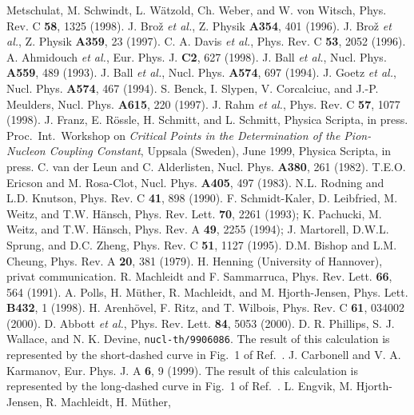 \begin{references}
Metschulat, M. Schwindt, L. W\"atzold, Ch. Weber, and W. von Witsch,
Phys. Rev. C {\bf 58}, 1325 (1998).
 J. Bro\v{z} {\it et al.}, Z. Physik {\bf A354}, 401 (1996).
 J. Bro\v{z} {\it et al.}, Z. Physik {\bf A359}, 23 (1997).
 C. A. Davis {\it et al.}, Phys. Rev. C {\bf 53}, 2052 (1996).
 A. Ahmidouch {\it et al.}, Eur. Phys. J. {\bf C2}, 627 (1998).
 J. Ball {\it et al.}, Nucl. Phys. {\bf A559}, 489 (1993).
 J. Ball {\it et al.}, Nucl. Phys. {\bf A574}, 697 (1994).
 J. Goetz {\it et al.}, Nucl. Phys. {\bf A574}, 467 (1994).
 S. Benck, I. Slypen, V. Corcalciuc, and J.-P. Meulders,
Nucl. Phys. {\bf A615}, 220 (1997).
 J. Rahm {\it et al.}, Phys. Rev. C {\bf 57}, 1077 (1998).
 J. Franz, E. R\"ossle, H. Schmitt, and L. Schmitt, 
Physica Scripta, in press.
 Proc.\ Int.\ Workshop on 
{\it Critical Points in the Determination of the Pion-Nucleon
Coupling Constant}, Uppsala (Sweden), June 1999, 
Physica Scripta, in press.
 C. van der Leun and C. Alderlisten, Nucl. Phys.
         {\bf A380}, 261 (1982).
 T.E.O. Ericson and M. Rosa-Clot, Nucl. Phys. {\bf A405},
         497 (1983).
 N.L. Rodning and L.D. Knutson, Phys. Rev. C {\bf 41},
         898 (1990).
 F. Schmidt-Kaler, D. Leibfried, M. Weitz, 
         and T.W. H\"ansch, Phys. Rev. Lett. {\bf 70}, 2261 (1993);
         K. Pachucki, M. Weitz, and T.W. H\"ansch, Phys. Rev. A
         {\bf 49}, 2255 (1994); J. Martorell, D.W.L. Sprung, and
         D.C. Zheng, Phys. Rev. C {\bf 51}, 1127 (1995).
 D.M. Bishop and L.M. Cheung, Phys. Rev. A {\bf 20},
         381 (1979).
 H. Henning (University of Hannover), privat communication.
 R. Machleidt and F. Sammarruca, Phys. Rev. Lett. {\bf 66},
564 (1991).
 A. Polls, H. M\"uther, R. Machleidt, and M. Hjorth-Jensen,
Phys. Lett. {\bf B432}, 1 (1998).
 H. Arenh\"ovel, F. Ritz, and T. Wilbois,
Phys. Rev. C {\bf 61}, 034002 (2000).
 D. Abbott {\it et al.}, Phys. Rev. Lett. {\bf 84}, 5053 (2000).
 D. R. Phillips, S. J. Wallace, and N. K. Devine,
{\tt nucl-th/9906086}.
The result of this calculation is represented by the short-dashed curve
in Fig.~1 of Ref.~\cite{Abb00}.
 J. Carbonell and V. A. Karmanov,
Eur. Phys. J. A {\bf 6}, 9 (1999).
The result of this calculation is represented by the long-dashed curve
in Fig.~1 of Ref.~\cite{Abb00}.
 L. Engvik, M. Hjorth-Jensen, R. Machleidt, H. M\"uther,

\end{references}
